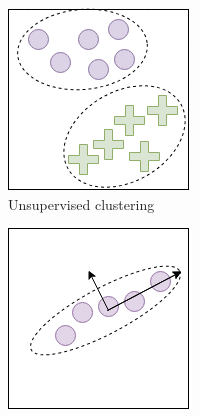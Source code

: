  \begin{figure}[h]
     \centering
     \begin{subfigure}[t]{0.337\textwidth}
         \centering
         \includegraphics[width=\textwidth]{background/figures/unsupervised_clustering.png}
         \caption{Unsupervised clustering}
         \label{fig:unsupervised_clustering}
     \end{subfigure}
     \hspace{15px}
     \begin{subfigure}[t]{0.34\textwidth}
         \centering
         \includegraphics[width=\textwidth]{background/figures/unsupervised_PCA.png}

\end{subfigure}
\end{figure}
